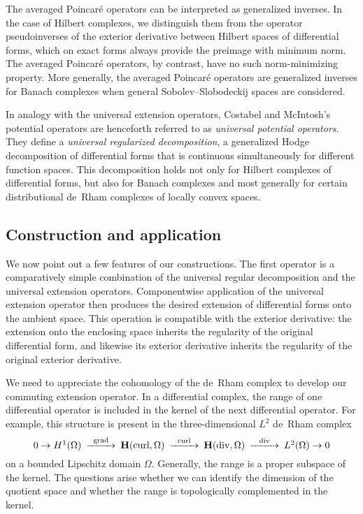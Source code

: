 \documentclass[10pt,a4paper]{amsart}
\theoremstyle{definition}
\theoremstyle{remark}
\numberwithin{equation}{section}
\newcommand{\bfH}{{\mathbf H}}
\newcommand{\Domain}{{\Omega}}
\newcommand{\grad}{\operatorname{grad}}
\newcommand{\curl}{\operatorname{curl}}
\newcommand{\divergence}{\operatorname{div}}
\begin{document}
The averaged Poincar\'e operators can be interpreted as generalized inverses. 
In the case of Hilbert complexes, we distinguish them from the operator pseudoinverses of the exterior derivative between Hilbert spaces of differential forms, which on exact forms always provide the preimage with minimum norm. 
The averaged Poincar\'e operators, by contrast, have no such norm-minimizing property. 
More generally, the averaged Poincar\'e operators are generalized inverses for Banach complexes when general Sobolev--Slobodeckij spaces are considered.

In analogy with the universal extension operators, 
Costabel and McIntosh's potential operators are henceforth referred to as \emph{universal potential operators}.
They define a \emph{universal regularized decomposition}, a generalized Hodge decomposition of differential forms that is continuous simultaneously for different function spaces.
This decomposition holds not only for Hilbert complexes of differential forms, but also for Banach complexes and most generally for certain distributional de~Rham complexes of locally convex spaces. 

\subsection{Construction and application}

We now point out a few features of our constructions. 
The first operator is a comparatively simple combination of the universal regular decomposition and the universal extension operators. 
Componentwise application of the universal extension operator then produces the desired extension of differential forms onto the ambient space. 
This operation is compatible with the exterior derivative: 
the extension onto the enclosing space inherits the regularity of the original differential form, and likewise its exterior derivative inherits the regularity of the original exterior derivative. 




We need to appreciate the cohomology of the de~Rham complex to develop our commuting extension operator. 
In a differential complex, the range of one differential operator is included in the kernel of the next differential operator. 
For example, this structure is present in the three-dimensional $L^{2}$ de~Rham complex 
\begin{align*}
    \begin{CD}
        0 \to H^{1}(\Domain) @>\grad>> \bfH(\curl,\Domain) @>\curl>> \bfH(\divergence,\Domain) @>\divergence>> L^{2}(\Domain) \to 0
    \end{CD}
\end{align*}
on a bounded Lipschitz domain $\Domain$.
Generally, the range is a proper subspace of the kernel. 
The questions arise whether we can identify the dimension of the quotient space and whether the range is topologically complemented in the kernel. 
\end{document}
